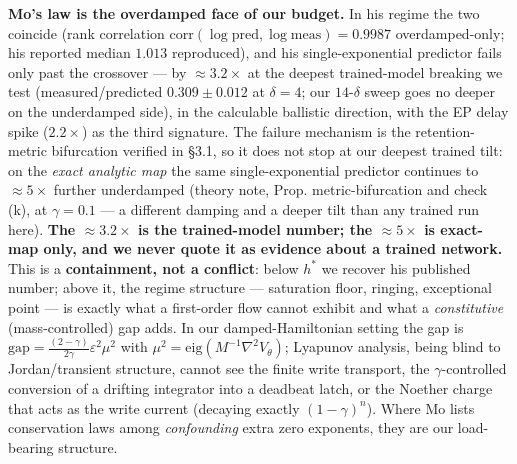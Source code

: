 \documentclass[10pt]{article}
\begin{document}
\textbf{Mo's law is the overdamped face of our budget.} In his regime the two coincide (rank correlation $\mathrm{corr}(\log\mathrm{pred},\log\mathrm{meas})=0.9987$ overdamped-only; his reported median $1.013$ reproduced), and his single-exponential predictor fails only past the crossover --- by $\approx3.2\times$ at the deepest trained-model breaking we test (measured/predicted $0.309\pm0.012$ at $\delta=4$; our $14$-$\delta$ sweep goes no deeper on the underdamped side), in the calculable ballistic direction, with the EP delay spike ($2.2\times$) as the third signature. The failure mechanism is the retention-metric bifurcation verified in \S3.1, so it does not stop at our deepest trained tilt: on the \emph{exact analytic map} the same single-exponential predictor continues to $\approx5\times$ further underdamped (theory note, Prop. metric-bifurcation and check (k), at $\gamma=0.1$ --- a different damping and a deeper tilt than any trained run here). \textbf{The $\approx3.2\times$ is the trained-model number; the $\approx5\times$ is exact-map only, and we never quote it as evidence about a trained network.} This is a \textbf{containment, not a conflict}: below $h^*$ we recover his published number; above it, the regime structure --- saturation floor, ringing, exceptional point --- is exactly what a first-order flow cannot exhibit and what a \emph{constitutive} (mass-controlled) gap adds. In our damped-Hamiltonian setting the gap is $\mathrm{gap}=\tfrac{(2-\gamma)}{2\gamma}\varepsilon^2\mu^2$ with $\mu^2=\mathrm{eig}(M^{-1}\nabla^2V_\theta)$; Lyapunov analysis, being blind to Jordan/transient structure, cannot see the finite write transport, the $\gamma$-controlled conversion of a drifting integrator into a deadbeat latch, or the Noether charge that acts as the write current (decaying exactly $(1-\gamma)^n$). Where Mo lists conservation laws among \emph{confounding} extra zero exponents, they are our load-bearing structure.
\end{document}
